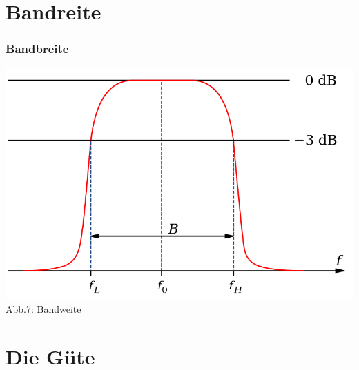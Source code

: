 \section*{Bandreite}
\begin{frame}
\frametitle{Bandbreite}
\begin{center}
	\includegraphics[scale=0.3]{a04/bandwidth.png}\\
	\tiny{Abb.7: Bandweite \cite{wmen}}
\end{center}
\end{frame}

\section*{Die Güte}


